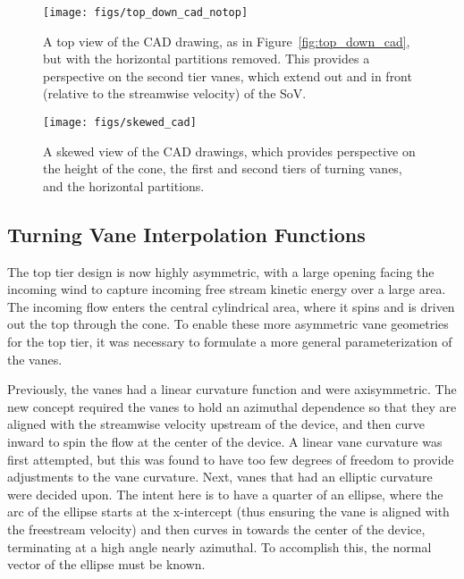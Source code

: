\begin{figure}[!htb]
  \begin{center}
   \texttt{[image: figs/top\_down\_cad\_notop]}
   \caption{A top view of the CAD drawing, as in
   Figure~\ref{fig:top_down_cad}, but with the horizontal partitions
   removed. This provides a perspective on the second tier vanes, which
   extend out and in front (relative to the streamwise velocity) of the
   SoV.}
   \label{fig:top_down_cad_notop}
  \end{center}
 \end{figure}

\begin{figure}[!htb]
  \begin{center}
   \texttt{[image: figs/skewed\_cad]}
   \caption{A skewed view of the CAD drawings, which provides
   perspective on the height of the cone, the first and second tiers of 
   turning vanes, and the horizontal partitions.}
   \label{fig:cad_skewed}
  \end{center}
 \end{figure}

\subsection{Turning Vane Interpolation Functions}
\label{sec:interpolate}

The top tier design is now highly asymmetric, with a
large opening facing the incoming wind to capture incoming free stream
kinetic energy over a large area. The incoming flow enters the central
cylindrical area, where it spins and is driven out the top through the
cone. To enable these more asymmetric vane geometries for the top tier,
it was necessary to formulate a more general parameterization of the
vanes.

Previously, the vanes had a linear curvature function and were
axisymmetric. The new concept required the vanes to hold an azimuthal
dependence so that they are aligned with the streamwise velocity upstream 
of the device, and then curve inward to spin the flow at the center of
the device. A linear vane curvature was first attempted, but this was
found to have too few degrees of freedom to provide adjustments to the
vane curvature. Next, vanes that had an elliptic curvature were decided
upon. The intent here is to have a quarter of an ellipse, where the arc
of the ellipse starts at the x-intercept (thus ensuring the vane is
aligned with the freestream velocity) and then curves in towards the
center of the device, terminating at a high angle nearly azimuthal. To
accomplish this, the normal vector of the ellipse must be known. 

